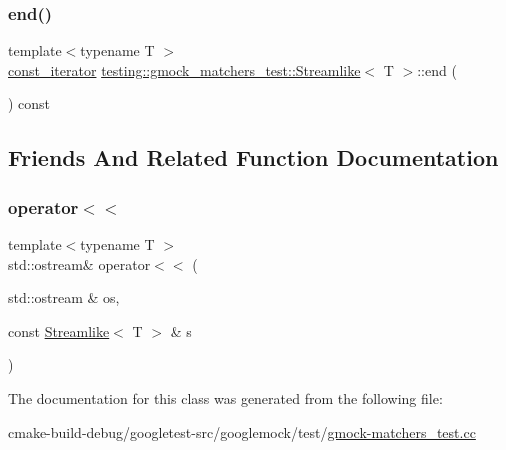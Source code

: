 \subsubsection{\texorpdfstring{end()}{end()}}
{\footnotesize\ttfamily template$<$typename T $>$ \\
\mbox{\hyperlink{classtesting_1_1gmock__matchers__test_1_1Streamlike_a2eeb61dca56f70d0266f5f8ae91d2c7b}{const\+\_\+iterator}} \mbox{\hyperlink{classtesting_1_1gmock__matchers__test_1_1Streamlike}{testing\+::gmock\+\_\+matchers\+\_\+test\+::\+Streamlike}}$<$ T $>$\+::end (\begin{DoxyParamCaption}{ }\end{DoxyParamCaption}) const\hspace{0.3cm}{\ttfamily [inline]}}



\subsection{Friends And Related Function Documentation}
\mbox{\label{classtesting_1_1gmock__matchers__test_1_1Streamlike_a4b45ba8c2a5ee61697003f02568df91f}} 
\subsubsection{\texorpdfstring{operator$<$$<$}{operator<<}}
{\footnotesize\ttfamily template$<$typename T $>$ \\
std\+::ostream\& operator$<$$<$ (\begin{DoxyParamCaption}\item[{std\+::ostream \&}]{os,  }\item[{const \mbox{\hyperlink{classtesting_1_1gmock__matchers__test_1_1Streamlike}{Streamlike}}$<$ T $>$ \&}]{s }\end{DoxyParamCaption})\hspace{0.3cm}{\ttfamily [friend]}}



The documentation for this class was generated from the following file\+:\begin{DoxyCompactItemize}
\item 
cmake-\/build-\/debug/googletest-\/src/googlemock/test/\mbox{\hyperlink{gmock-matchers__test_8cc}{gmock-\/matchers\+\_\+test.\+cc}}\end{DoxyCompactItemize}
